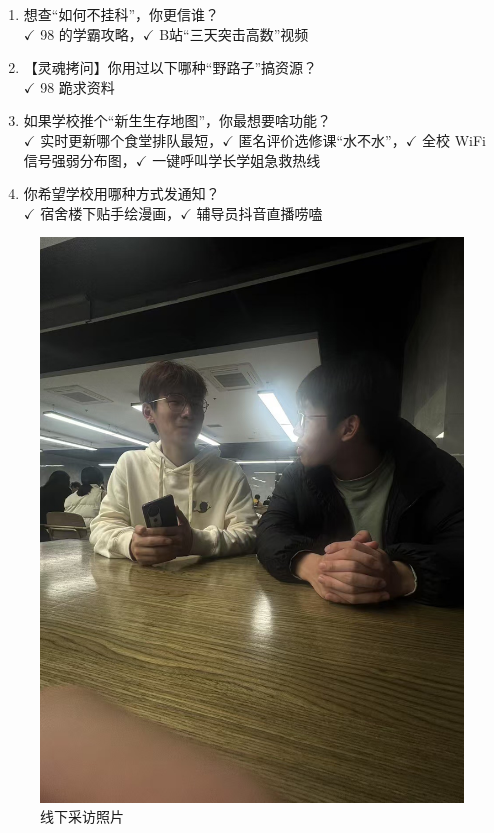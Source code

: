 \begin{enumerate}
    \item 想查“如何不挂科”，你更信谁？\\
    $\checkmark$ 98 的学霸攻略，$\checkmark$ B站“三天突击高数”视频

    \item 【灵魂拷问】你用过以下哪种“野路子”搞资源？\\
    $\checkmark$ 98 跪求资料

    \item 如果学校推个“新生生存地图”，你最想要啥功能？\\
    $\checkmark$ 实时更新哪个食堂排队最短，$\checkmark$ 匿名评价选修课“水不水”，$\checkmark$ 全校 WiFi 信号强弱分布图，$\checkmark$ 一键呼叫学长学姐急救热线

    \item 你希望学校用哪种方式发通知？\\
    $\checkmark$ 宿舍楼下贴手绘漫画，$\checkmark$ 辅导员抖音直播唠嗑

\end{enumerate}

\begin{figure}[H]
    \centering
    \includegraphics[width=\textwidth]{./resource/采访照片.JPG}
    \caption{线下采访照片}
\end{figure}